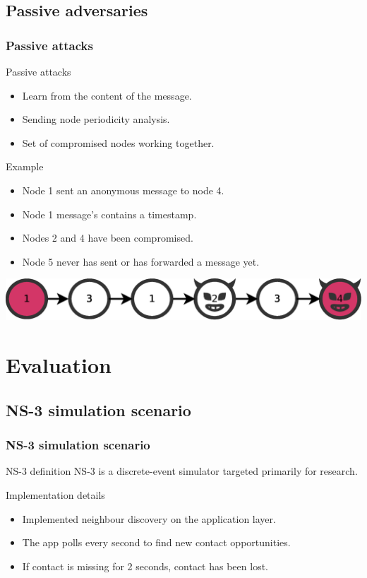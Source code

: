 \documentclass[compress,red]{beamer}
\begin{document}
\subsection{Passive adversaries}
\begin{frame}
\frametitle{Passive attacks}
\begin{block}{Passive attacks}
\begin{itemize}
\item Learn from the content of the message.
\item Sending node periodicity analysis.
\item Set of compromised nodes working together.
\end{itemize}
\end{block}
\begin{block}{Example}
\begin{itemize}
\item Node 1 sent an anonymous message to node 4.
\item Node 1 message's contains a timestamp.
\item Nodes 2 and 4 have been compromised.
\item Node 5 never has sent or has forwarded a message yet.
\end{itemize}
\centering \includegraphics[width=.7\linewidth]{../paper/imgs/presentation/evil-path}
\end{block}
\end{frame}

\section{Evaluation}
\subsection{NS-3 simulation scenario}
\begin{frame}
\frametitle{NS-3 simulation scenario}
\begin{block}{NS-3 definition}
NS-3 is a discrete-event simulator targeted primarily for research.
\end{block}
\bigskip
\begin{block}{Implementation details}
\begin{itemize}
\item Implemented neighbour discovery on the application layer.
\item The app polls every second to find new contact opportunities.
\item If contact is missing for 2 seconds, contact has been lost.
\end{itemize}
\end{block}
\bigskip
\end{frame}
\end{document}
